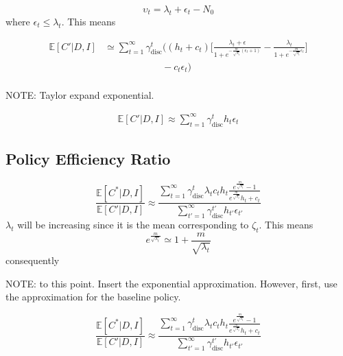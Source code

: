\begin{equation}
	\upsilon_t= \lambda_t+\epsilon_t-N_0
\end{equation}
where $\epsilon_t\leq \lambda_t$. This means

\begin{equation}
	\begin{split}
		\mathbb{E}[C'|D,I] &\simeq \sum_{t=1}^{\infty} \gamma_{\text{disc}}^{t} \bigg( 
		(h_t+c_t)\bigg[\frac{\lambda_t+\epsilon}{1+e^{-\frac{m}{\sqrt{\lambda_t}}(\epsilon_t+1)}}- \frac{\lambda_t}{1+e^{-\frac{m}{\sqrt{\lambda_t}}\epsilon_t}}\bigg]\\
		&\qquad\qquad\qquad
		- c_t\epsilon_t\bigg)\\
	\end{split}
\end{equation}

{\color{red} NOTE: Taylor expand exponential.}


\begin{equation}
	\begin{split}
		\mathbb{E}[C'|D,I] \approx \sum_{t=1}^{\infty} \gamma_{\text{disc}}^{t} h_t\epsilon_t
	\end{split}
\end{equation}


\subsection{Policy Efficiency Ratio}

\begin{equation}
	\frac{\mathbb{E}[C^*|D,I] }{\mathbb{E}[C'|D,I]}\approx \frac{\sum_{t=1}^{\infty} \gamma_{\text{disc}}^{t} \lambda_tc_th_t\frac{e^{\frac{m}{\sqrt{\lambda_t}}}-1}{e^{\frac{m}{\sqrt{\lambda_t}}}h_t+c_t}}{\sum_{t'=1}^{\infty} \gamma_{\text{disc}}^{t'} h_{t'}\epsilon_{t'}}
\end{equation}
$\lambda_t$ will be increasing since it is the mean corresponding to $\zeta_t$. This means 
\begin{equation}
	e^{\frac{m}{\sqrt{\lambda_t}}}\simeq 1+\frac{m}{\sqrt{\lambda_t}}
\end{equation}
consequently

{\color{red} NOTE: to this point. Insert the exponential approximation. However, first, use the approximation for the baseline policy.}

\begin{equation}
	\frac{\mathbb{E}[C^*|D,I] }{\mathbb{E}[C'|D,I]}\approx \frac{\sum_{t=1}^{\infty} \gamma_{\text{disc}}^{t} \lambda_tc_th_t\frac{e^{\frac{m}{\sqrt{\lambda_t}}}-1}{e^{\frac{m}{\sqrt{\lambda_t}}}h_t+c_t}}{\sum_{t'=1}^{\infty} \gamma_{\text{disc}}^{t'} h_{t'}\epsilon_{t'}}
\end{equation}


